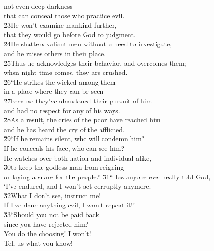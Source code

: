 \begin{poetry}
\poemll    not even deep darkness--- \\
\poemlll       that can conceal those who practice evil. \\
\poeml \v{23}He won't examine mankind further, \\
\poemll    that they would go before God to judgment. \\
\poeml \v{24}He shatters valiant men without a need to investigate, \\
\poemll    and he raises others in their place. \\
\poeml \v{25}Thus he acknowledges their behavior, and overcomes them; \\
\poemll    when night time comes, they are crushed. \\
\poeml \v{26}``He strikes the wicked among them \\
\poemll    in a place where they can be seen \\
\poeml \v{27}because they've abandoned their pursuit of him \\
\poemll    and had no respect for any of his ways. \\
\poeml \v{28}As a result, the cries of the poor have reached him \\
\poemll    and he has heard the cry of the afflicted. \\
\poeml \v{29}``If he remains silent, who will condemn him? \\
\poemll    If he conceals his face, who can see him? \\
\poemlll       He watches over both nation and individual alike, \\
\poeml \v{30}to keep the godless man from reigning \\
\poemll    or laying a snare for the people.''
\poeml \v{31}``Has anyone ever really told God, \\
\poemll    `I've endured, and I won't act corruptly anymore. \\
\poeml \v{32}What I don't see, instruct me! \\
\poemll    If I've done anything evil, I won't repeat it!' \\
\poeml \v{33}``Should you not be paid back, \\
\poemll    since you have rejected him? \\
\poeml You do the choosing! I won't! \\
\poemll    Tell us what you know!

\end{poetry}

